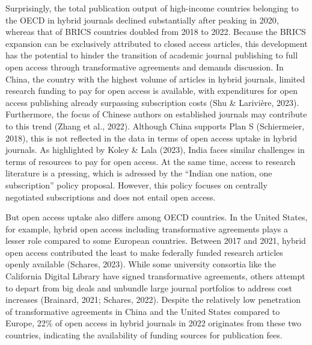 \documentclass[a4paper,man,floatsintext,longtable,noextraspace,12pt]{apa6}
\begin{document}
Surprisingly, the total publication output of high-income countries
belonging to the OECD in hybrid journals declined substantially after
peaking in 2020, whereas that of BRICS countries doubled from 2018 to
2022. Because the BRICS expansion can be exclusively attributed to
closed access articles, this development has the potential to hinder the
transition of academic journal publishing to full open access through
transformative agreements and demands discussion. In China, the country
with the highest volume of articles in hybrid journals, limited research
funding to pay for open access is available, with expenditures for open
access publishing already surpassing subscription costs (Shu \&
Larivière, 2023). Furthermore, the focus of Chinese authors on
established journals may contribute to this trend (Zhang et al., 2022).
Although China supports Plan S (Schiermeier, 2018), this is not
reflected in the data in terms of open access uptake in hybrid journals.
As highlighted by Koley \& Lala (2023), India faces similar challenges
in terms of resources to pay for open access. At the same time, access
to research literature is a pressing, which is adressed by the ``Indian
one nation, one subscription'' policy proposal. However, this policy
focuses on centrally negotiated subscriptions and does not entail open
access.

But open access uptake also differs among OECD countries. In the United
States, for example, hybrid open access including transformative
agreements plays a lesser role compared to some European countries.
Between 2017 and 2021, hybrid open access contributed the least to make
federally funded research articles openly available (Schares, 2023).
While some university consortia like the California Digital Library have
signed transformative agreements, others attempt to depart from big
deals and unbundle large journal portfolios to address cost increases
(Brainard, 2021; Schares, 2022). Despite the relatively low penetration
of transformative agreements in China and the United States compared to
Europe, 22\% of open access in hybrid journals in 2022 originates from
these two countries, indicating the availability of funding sources for
publication fees.
\end{document}
